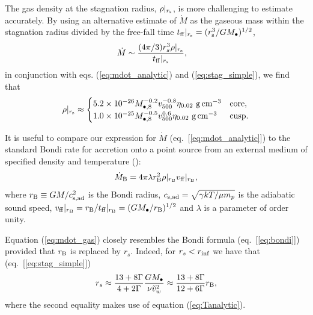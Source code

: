 \documentclass[usenatbib,fleqn]{mn2e}
\newcommand{\rs}{r_s}
\newcommand{\vw}{\tilde{v}_{w}}
\newcommand{\Mbh}[1][]{M_{\bullet#1}}
\newcommand{\Mbheight}{M_{\bullet,8}}
\newcommand{\tff}{t_{\rm ff}}
\newcommand{\densSlope}{\nu}
\begin{document}
The gas density at the stagnation radius, $\rho|_{r_{\rm s}}$, is more
challenging to estimate accurately.  By using an alternative estimate of
$\dot{M}$ as the gaseous mass within the stagnation radius divided by
the free-fall time $t_{\rm ff}|_{r_{\rm s}} = (r_{\rm
  s}^{3}/GM_{\bullet})^{1/2}$,
\begin{align}
  &\dot{M}\sim\frac{(4 \pi/3) \rs^3 \rho|_{r_{\rm s}}}{\tff|_{r_{\rm s}}},
  \label{eq:mdot_gas}
\end{align}
 in conjunction with eqs. (\ref{eq:mdot_analytic}) and (\ref{eq:stag_simple}), we find that
\begin{align}
  \rho|_{r_{\rm s}}\approx
  \begin{cases}
    5.2 \times 10^{-26} \Mbheight^{-0.2} v_{500}^{-0.8}  \eta_{0.02} \,
    \, {\rm g \, cm^{-3}}& \text{core},\\
    1.0 \times 10^{-25}  \Mbheight^{-0.5} v_{500}^{0.6}  \eta_{0.02} \,\, {\rm g \,cm^{-3}} & \text{cusp}.
  \end{cases}
  \label{eq:rhors}
\end{align}


It is useful to compare our expression for $\dot{M}$ (eq.~[\ref{eq:mdot_analytic}]) to the standard Bondi rate for accretion onto a point source from an external medium of specified density and temperature (\citealt{Bondi52}):
\begin{align}
  \dot{M}_{\rm B} =4\pi \lambda r_{\rm B}^2 \rho|_{r_{\rm B}}v_{\rm
    ff}|_{r_{\rm B}},
\label{eq:bondi}
\end{align}
where $r_{\rm B} \equiv GM/c_{\rm s,ad}^{2}$ is the Bondi radius,
$c_{\rm s,ad} = \sqrt{\gamma kT/\mu m_p}$ is the adiabatic sound
speed, $v_{\rm ff}|_{r_{\rm B}} = r_{\rm B}/t_{\rm ff}|_{r_{\rm B}} =
(GM_{\bullet}/r_{\rm B})^{1/2}$ and $\lambda$ is a parameter of order
unity.

Equation (\ref{eq:mdot_gas}) closely resembles the Bondi formula (eq.~[\ref{eq:bondi}]) provided that $r_{\rm B}$ is replaced by $\rs$.  Indeed, for $r_{s} < r_{\rm inf}$ we have that (eq.~[\ref{eq:stag_simple}])
\begin{align}
  \rs\approx\frac{13+8\Gamma}{4+2\Gamma}\frac{G \Mbh}{\densSlope
    \vw^2} \approx \frac{13+8\Gamma}{12+6\Gamma}r_{\rm B},
  \label{eq:rbondi}
\end{align}
where the second equality makes use of equation (\ref{eq:Tanalytic}).  
\end{document}
